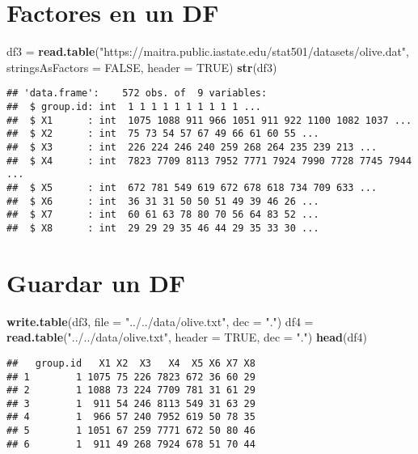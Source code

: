 \documentclass[
]{article}
\newenvironment{Shaded}{\begin{snugshade}}{\end{snugshade}}
\newcommand{\DataTypeTok}[1]{\textcolor[rgb]{0.13,0.29,0.53}{#1}}
\newcommand{\KeywordTok}[1]{\textcolor[rgb]{0.13,0.29,0.53}{\textbf{#1}}}
\newcommand{\NormalTok}[1]{#1}
\newcommand{\OtherTok}[1]{\textcolor[rgb]{0.56,0.35,0.01}{#1}}
\newcommand{\StringTok}[1]{\textcolor[rgb]{0.31,0.60,0.02}{#1}}
\begin{document}
\hypertarget{factores-en-un-df}{%
\section{Factores en un DF}\label{factores-en-un-df}}

\begin{Shaded}
\begin{Highlighting}[]
\NormalTok{df3 =}\StringTok{ }\KeywordTok{read.table}\NormalTok{(}\StringTok{"https://maitra.public.iastate.edu/stat501/datasets/olive.dat"}\NormalTok{,}
                 \DataTypeTok{stringsAsFactors =} \OtherTok{FALSE}\NormalTok{,}
                 \DataTypeTok{header =} \OtherTok{TRUE}\NormalTok{)}
\KeywordTok{str}\NormalTok{(df3)}
\end{Highlighting}
\end{Shaded}

\begin{verbatim}
## 'data.frame':    572 obs. of  9 variables:
##  $ group.id: int  1 1 1 1 1 1 1 1 1 1 ...
##  $ X1      : int  1075 1088 911 966 1051 911 922 1100 1082 1037 ...
##  $ X2      : int  75 73 54 57 67 49 66 61 60 55 ...
##  $ X3      : int  226 224 246 240 259 268 264 235 239 213 ...
##  $ X4      : int  7823 7709 8113 7952 7771 7924 7990 7728 7745 7944 ...
##  $ X5      : int  672 781 549 619 672 678 618 734 709 633 ...
##  $ X6      : int  36 31 31 50 50 51 49 39 46 26 ...
##  $ X7      : int  60 61 63 78 80 70 56 64 83 52 ...
##  $ X8      : int  29 29 29 35 46 44 29 35 33 30 ...
\end{verbatim}

\hypertarget{guardar-un-df}{%
\section{Guardar un DF}\label{guardar-un-df}}

\begin{Shaded}
\begin{Highlighting}[]
\KeywordTok{write.table}\NormalTok{(df3, }\DataTypeTok{file =} \StringTok{"../../data/olive.txt"}\NormalTok{, }\DataTypeTok{dec =} \StringTok{"."}\NormalTok{)}
\NormalTok{df4 =}\StringTok{ }\KeywordTok{read.table}\NormalTok{(}\StringTok{"../../data/olive.txt"}\NormalTok{, }\DataTypeTok{header =} \OtherTok{TRUE}\NormalTok{, }\DataTypeTok{dec =} \StringTok{"."}\NormalTok{)}
\KeywordTok{head}\NormalTok{(df4)}
\end{Highlighting}
\end{Shaded}

\begin{verbatim}
##   group.id   X1 X2  X3   X4  X5 X6 X7 X8
## 1        1 1075 75 226 7823 672 36 60 29
## 2        1 1088 73 224 7709 781 31 61 29
## 3        1  911 54 246 8113 549 31 63 29
## 4        1  966 57 240 7952 619 50 78 35
## 5        1 1051 67 259 7771 672 50 80 46
## 6        1  911 49 268 7924 678 51 70 44
\end{verbatim}
\end{document}
